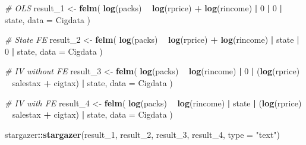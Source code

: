 \documentclass[]{book}
\newenvironment{Shaded}{\begin{snugshade}}{\end{snugshade}}
\newcommand{\KeywordTok}[1]{\textcolor[rgb]{0.13,0.29,0.53}{\textbf{#1}}}
\newcommand{\DataTypeTok}[1]{\textcolor[rgb]{0.13,0.29,0.53}{#1}}
\newcommand{\DecValTok}[1]{\textcolor[rgb]{0.00,0.00,0.81}{#1}}
\newcommand{\StringTok}[1]{\textcolor[rgb]{0.31,0.60,0.02}{#1}}
\newcommand{\CommentTok}[1]{\textcolor[rgb]{0.56,0.35,0.01}{\textit{#1}}}
\newcommand{\OperatorTok}[1]{\textcolor[rgb]{0.81,0.36,0.00}{\textbf{#1}}}
\newcommand{\NormalTok}[1]{#1}
\begin{document}
\begin{Shaded}
\begin{Highlighting}[]
\CommentTok{# OLS}
\NormalTok{result_}\DecValTok{1}\NormalTok{ <-}\StringTok{ }\KeywordTok{felm}\NormalTok{( }\KeywordTok{log}\NormalTok{(packs) }\OperatorTok{~}\StringTok{ }\KeywordTok{log}\NormalTok{(rprice) }\OperatorTok{+}\StringTok{ }\KeywordTok{log}\NormalTok{(rincome)  }\OperatorTok{|}\StringTok{ }\DecValTok{0} \OperatorTok{|}\StringTok{ }\DecValTok{0} \OperatorTok{|}\StringTok{ }\NormalTok{state, }\DataTypeTok{data =}\NormalTok{ Cigdata )}

\CommentTok{# State FE}
\NormalTok{result_}\DecValTok{2}\NormalTok{ <-}\StringTok{ }\KeywordTok{felm}\NormalTok{( }\KeywordTok{log}\NormalTok{(packs) }\OperatorTok{~}\StringTok{ }\KeywordTok{log}\NormalTok{(rprice) }\OperatorTok{+}\StringTok{ }\KeywordTok{log}\NormalTok{(rincome)  }\OperatorTok{|}\StringTok{ }\NormalTok{state }\OperatorTok{|}\StringTok{ }\DecValTok{0} \OperatorTok{|}\StringTok{ }\NormalTok{state, }\DataTypeTok{data =}\NormalTok{ Cigdata )}

\CommentTok{# IV without FE}
\NormalTok{result_}\DecValTok{3}\NormalTok{ <-}\StringTok{ }\KeywordTok{felm}\NormalTok{( }\KeywordTok{log}\NormalTok{(packs) }\OperatorTok{~}\StringTok{ }\KeywordTok{log}\NormalTok{(rincome)  }\OperatorTok{|}\StringTok{ }\DecValTok{0} \OperatorTok{|}\StringTok{ }\NormalTok{(}\KeywordTok{log}\NormalTok{(rprice) }\OperatorTok{~}\StringTok{  }\NormalTok{salestax }\OperatorTok{+}\StringTok{ }\NormalTok{cigtax) }\OperatorTok{|}\StringTok{ }\NormalTok{state, }\DataTypeTok{data =}\NormalTok{ Cigdata )}

\CommentTok{# IV with FE }
\NormalTok{result_}\DecValTok{4}\NormalTok{ <-}\StringTok{ }\KeywordTok{felm}\NormalTok{( }\KeywordTok{log}\NormalTok{(packs) }\OperatorTok{~}\StringTok{ }\KeywordTok{log}\NormalTok{(rincome)  }\OperatorTok{|}\StringTok{ }\NormalTok{state }\OperatorTok{|}\StringTok{ }\NormalTok{(}\KeywordTok{log}\NormalTok{(rprice) }\OperatorTok{~}\StringTok{  }\NormalTok{salestax }\OperatorTok{+}\StringTok{ }\NormalTok{cigtax) }\OperatorTok{|}\StringTok{ }\NormalTok{state, }\DataTypeTok{data =}\NormalTok{ Cigdata )}

\NormalTok{stargazer}\OperatorTok{::}\KeywordTok{stargazer}\NormalTok{(result_}\DecValTok{1}\NormalTok{, result_}\DecValTok{2}\NormalTok{, result_}\DecValTok{3}\NormalTok{, result_}\DecValTok{4}\NormalTok{, }\DataTypeTok{type =} \StringTok{"text"}\NormalTok{)}
\end{Highlighting}
\end{Shaded}
\end{document}
